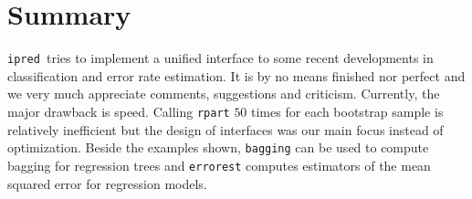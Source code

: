 \documentclass[11pt]{article}
\newcommand{\ipred}{\texttt{ipred }}
\begin{document}


\section{Summary}
\ipred tries to implement a unified interface to some recent developments
in classification and error rate estimation. It is by no means finished
nor perfect and we very much appreciate comments, suggestions and criticism.
Currently, the major drawback is speed. Calling \texttt{rpart} $50$ 
times for each bootstrap sample is relatively inefficient 
but the design of interfaces was our main focus instead of optimization.
Beside the examples shown, \texttt{bagging} can be used to compute bagging
for regression trees and \texttt{errorest} computes estimators of the 
mean squared error for regression models.



\end{document}
